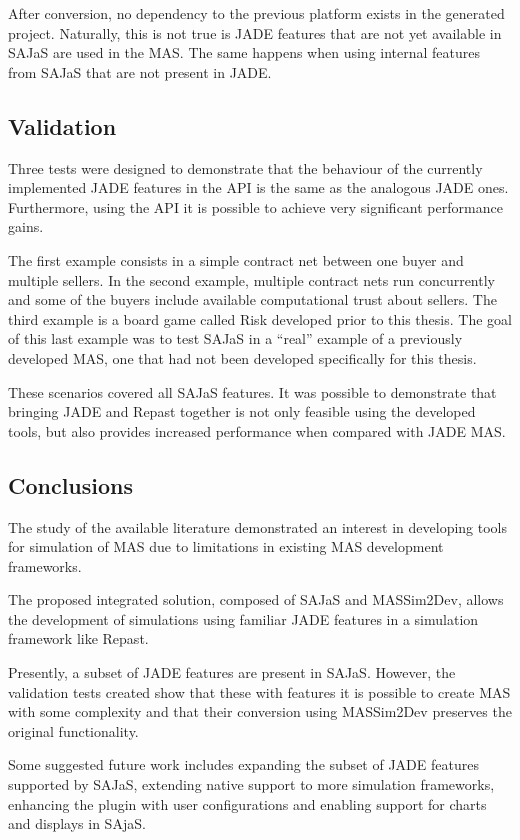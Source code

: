 \documentclass[9pt,a4paper]{extarticle}
\begin{document}
\begin{multicols}{2}
After conversion, no dependency to the previous platform exists in the generated project. Naturally, this is not true is JADE features that are not yet available in SAJaS are used in the MAS. The same happens when using internal features from SAJaS that are not present in JADE.

\subsection{Validation}
Three tests were designed to demonstrate that the behaviour of the currently implemented JADE features in the API is the same as the analogous JADE ones. Furthermore, using the API it is possible to achieve very significant performance gains.

The first example consists in a simple contract net between one buyer and multiple sellers. In the second example, multiple contract nets run concurrently and some of the buyers include available computational trust about sellers. 
The third example is a board game called Risk developed prior to this thesis. The goal of this last example was to test SAJaS in a ``real'' example of a previously developed MAS, one that had not been developed specifically for this thesis.

These scenarios covered all SAJaS features. It was possible to demonstrate that bringing JADE and Repast together is not only feasible using the developed tools, but also provides increased performance when compared with JADE MAS.

\subsection{Conclusions}
The study of the available literature demonstrated an interest in developing tools for simulation of MAS due to limitations in existing MAS development frameworks.

The proposed integrated solution, composed of SAJaS and MASSim2Dev, allows the development of simulations using familiar JADE features in a simulation framework like Repast.

Presently, a subset of JADE features are present in SAJaS. However, the validation tests created show that these with features it is possible to create MAS with some complexity and that their conversion using MASSim2Dev preserves the original functionality.

Some suggested future work includes expanding the subset of JADE features supported by SAJaS, extending native support to more simulation frameworks, enhancing the plugin with user configurations and enabling support for charts and displays in SAjaS.



\end{multicols}
\end{document}
